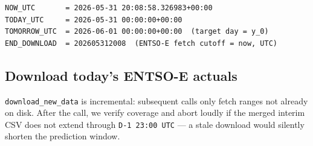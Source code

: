 \documentclass[
  english,
  letterpaper,
]{scrbook}
\begin{document}
\begin{verbatim}
NOW_UTC       = 2026-05-31 20:08:58.326983+00:00
TODAY_UTC     = 2026-05-31 00:00:00+00:00
TOMORROW_UTC  = 2026-06-01 00:00:00+00:00  (target day = y_0)
END_DOWNLOAD  = 202605312008  (ENTSO-E fetch cutoff = now, UTC)
\end{verbatim}

\subsection{Download today's ENTSO-E
actuals}\label{download-todays-entso-e-actuals}

\texttt{download\_new\_data} is incremental: subsequent calls only fetch
ranges not already on disk. After the call, we verify coverage and abort
loudly if the merged interim CSV does not extend through
\texttt{D-1\ 23:00\ UTC} --- a stale download would silently shorten the
prediction window.
\end{document}
